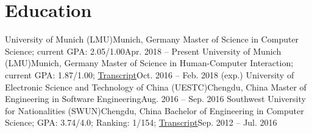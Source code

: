 \section{\textbf{Education}}
  \resumeSubHeadingListStart
    \resumeSubheading
      {University of Munich (LMU)}{Munich, Germany}
      {Master of Science in Computer Science; current GPA: 2.05/1.00}{Apr. 2018 -- Present}
    \resumeSubheading
      {University of Munich (LMU)}{Munich, Germany}
      {Master of Science in Human-Computer Interaction; current GPA: 1.87/1.00; \href{https://github.com/changkun/resume/blob/master/assets/transcript-master-hci.pdf}{Transcript}}{Oct. 2016 -- Feb. 2018 (exp.)}
    \resumeSubheading
      {University of Electronic Science and Technology of China (UESTC)}{Chengdu, China}
      {Master of Engineering in Software Engineering}{Aug. 2016 -- Sep. 2016}
    \resumeSubheading
      {Southwest University for Nationalities (SWUN)}{Chengdu, China}
      {Bachelor of Engineering in Computer Science;  GPA: 3.74/4.0; Ranking: 1/154; \href{https://github.com/changkun/resume/blob/master/assets/bachelor-transcript.pdf}{Transcript}}{Sep. 2012 -- Jul. 2016}
  \resumeSubHeadingListEnd